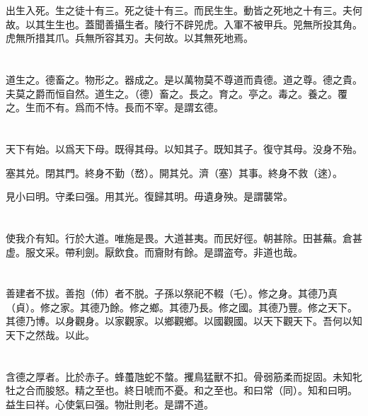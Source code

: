 \documentclass[a5paper]{ctexbook}
\begin{document}
    出生入死。生之徒十有三。死之徒十有三。而民生生。動皆之死地之十有三。夫何故。以其生生也。蓋聞善攝生者。陵行不辟兕虎。入軍不被甲兵。兕無所投其角。虎無所措其爪。兵無所容其刃。夫何故。以其無死地焉。

    \chapter{}

    道生之。德畜之。物形之。器成之。是以萬物莫不尊道而貴德。道之尊。德之貴。夫莫之爵而恒自然。道生之。（德）畜之。長之。育之。亭之。毒之。養之。覆之。生而不有。爲而不恃。長而不宰。是謂玄德。

    \chapter{}

    天下有始。以爲天下母。既得其母。以知其子。既知其子。復守其母。没身不殆。
    
    塞其兑。閉其門。終身不勤（嵍）。開其兑。濟（塞）其事。終身不救（逨）。
    
    見小曰明。守柔曰强。用其光。復歸其明。毋遺身殃。是謂襲常。

    \chapter{}

    使我介有知。行於大道。唯施是畏。大道甚夷。而民好徑。朝甚除。田甚蕪。倉甚虚。服文采。帶利劍。厭飲食。而齎財有餘。是謂盗夸。非道也哉。

    \chapter{}

    善建者不拔。善抱（伂）者不脱。子孫以祭祀不輟（乇）。修之身。其德乃真（貞）。修之家。其德乃餘。修之鄉。其德乃長。修之國。其德乃豐。修之天下。其德乃博。以身觀身。以家觀家。以鄉觀鄉。以國觀國。以天下觀天下。吾何以知天下之然哉。以此。

    \chapter{}

    含德之厚者。比於赤子。蜂蠆虺蛇不螫。攫鳥猛獸不扣。骨弱筋柔而捉固。未知牝牡之合而朘怒。精之至也。終日唬而不憂。和之至也。和曰常（同）。知和曰明。益生曰祥。心使氣曰强。物壯則老。是謂不道。

    \chapter{}
\end{document}
